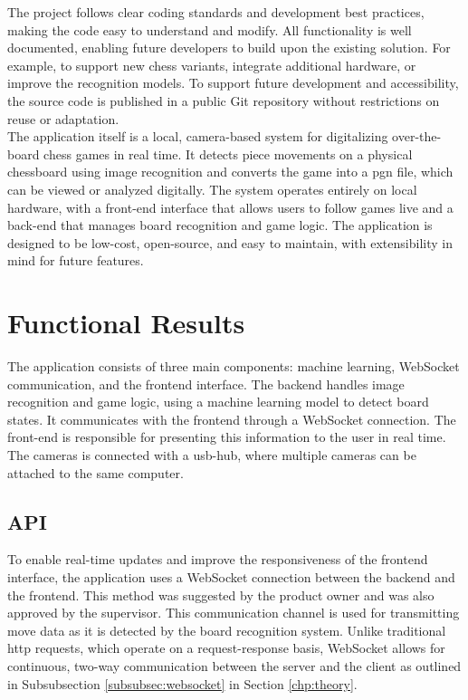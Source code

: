 The project follows clear coding standards and development best practices, making the code easy to understand and modify. All functionality is well documented, enabling future developers to build upon the existing solution. For example, to support new chess variants, integrate additional hardware, or improve the recognition models. To support future development and accessibility, the source code is published in a public Git repository without restrictions on reuse or adaptation. \\

The application itself is a local, camera-based system for digitalizing over-the-board chess games in real time. It detects piece movements on a physical chessboard using image recognition and converts the game into a \gls{pgn} file, which can be viewed or analyzed digitally. The system operates entirely on local hardware, with a front-end interface that allows users to follow games live and a back-end that manages board recognition and game logic. The application is designed to be low-cost, open-source, and easy to maintain, with extensibility in mind for future features.

\section{Functional Results}
The application consists of three main components: machine learning, WebSocket communication, and the frontend interface. The backend handles image recognition and game logic, using a machine learning model to detect board states. It communicates with the frontend through a WebSocket connection. The front-end is responsible for presenting this information to the user in real time. The cameras is connected with a \acrshort{usb}-hub, where multiple cameras can be attached to the same computer. 

\subsection{API}
To enable real-time updates and improve the responsiveness of the frontend interface, the application uses a WebSocket connection between the backend and the frontend. This method was suggested by the product owner and was also approved by the supervisor. This communication channel is used for transmitting move data as it is detected by the board recognition system. Unlike traditional \gls{http} requests, which operate on a request-response basis, WebSocket allows for continuous, two-way communication between the server and the client as outlined in Subsubsection \ref{subsubsec:websocket} in Section \ref{chp:theory}. \\

